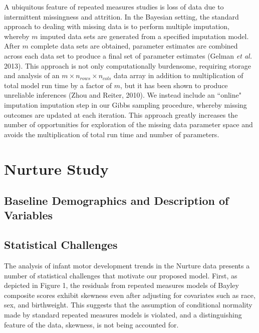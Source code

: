 \documentclass[useAMS,referee]{biom}
\begin{document}
A ubiquitous feature of repeated measures studies is loss of data due to intermittent missingness and attrition. In the Bayesian setting, the standard approach to dealing with missing data is to perform multiple imputation, whereby $m$ imputed data sets are generated from a specified imputation model. After $m$ complete data sets are obtained, parameter estimates are combined across each data set to produce a final set of parameter estimates (Gelman \textit{et al.} 2013). This approach is not only computationally burdensome, requiring storage and analysis of an $m \times n_{rows} \times n_{cols}$ data array in addition to multiplication of total model run time by a factor of $m$, but it has been shown to produce unreliable inferences (Zhou and Reiter, 2010). We instead include an ``online" imputation imputation step in our Gibbs sampling procedure, whereby missing outcomes are updated at each iteration. This approach greatly increases the number of opportunities for exploration of the missing data parameter space and avoids the multiplication of total run time and number of parameters.

\newpage

\section{Nurture Study}
\label{s:nurt}
\subsection{Baseline Demographics and Description of Variables}

\subsection{Statistical Challenges}

The analysis of infant motor development trends in the Nurture data presents a number of statistical challenges that motivate our proposed model. First, as depicted in Figure 1, the residuals from repeated measures models of Bayley composite scores exhibit skewness even after adjusting for covariates such as race, sex, and birthweight. This suggests that the assumption of conditional normality made by standard repeated measures models is violated, and a distinguishing feature of the data, skewness, is not being accounted for. 
\end{document}
